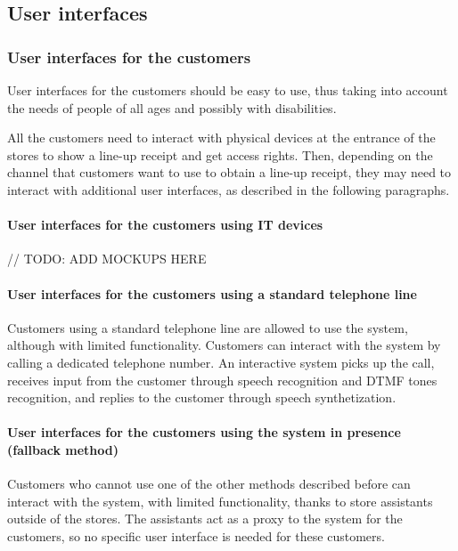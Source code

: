 \documentclass[../../main.tex]{subfiles}
\begin{document}
\subsection{User interfaces}

  \subsubsection{User interfaces for the customers}

  User interfaces for the customers should be easy to use, thus taking into
  account the needs of people of all ages and possibly with disabilities.

  All the customers need to interact with physical devices at the entrance of
  the stores to show a line-up receipt and get access rights. Then, depending on
  the channel that customers want to use to obtain a line-up receipt, they may
  need to interact with additional user interfaces, as described in the
  following paragraphs.

  \paragraph{User interfaces for the customers using IT devices}

  // TODO: ADD MOCKUPS HERE

  \paragraph{User interfaces for the customers using a standard telephone line}

  Customers using a standard telephone line are allowed to use the system,
  although with limited functionality. Customers can interact with the system by
  calling a dedicated telephone number. An interactive system picks up the call,
  receives input from the customer through speech recognition and DTMF tones
  recognition, and replies to the customer through speech synthetization.

  \paragraph{User interfaces for the customers using the system in presence (fallback method)}

  Customers who cannot use one of the other methods described before can
  interact with the system, with limited functionality, thanks to store
  assistants outside of the stores. The assistants act as a proxy to the system
  for the customers, so no specific user interface is needed for these
  customers.
\end{document}
